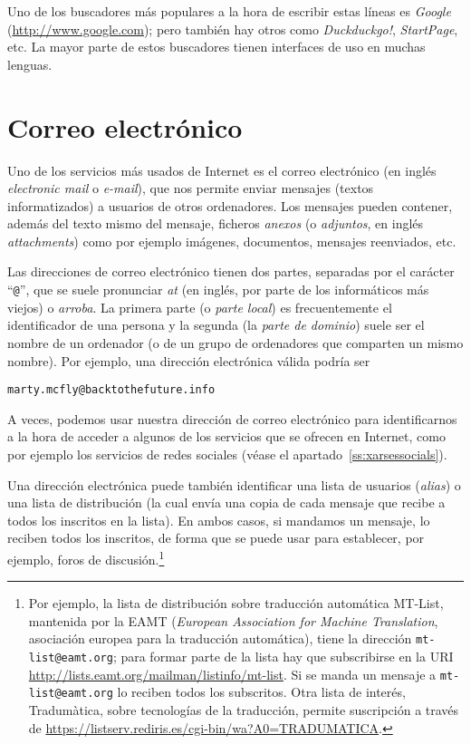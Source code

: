 Uno de los buscadores más populares a la hora de escribir estas líneas es \emph{Google} (\url{http://www.google.com}); pero también hay otros como \emph{Duckduckgo!}, \emph{StartPage}, etc. La mayor parte de estos buscadores tienen interfaces de uso en muchas lenguas. 

\section{Correo electrónico} \label{ss:correue} Uno de los servicios más usados de Internet es el correo electrónico (en inglés \emph{electronic mail} o \emph{e-mail}), que nos permite enviar mensajes (textos informatizados) a usuarios de otros ordenadores. Los mensajes pueden contener, además del texto mismo del mensaje, ficheros \emph{anexos} (o \emph{adjuntos}, en inglés \emph{attachments}) como por ejemplo imágenes, documentos, mensajes reenviados, etc. 

Las direcciones de correo electrónico tienen dos partes, separadas por el carácter ``\texttt{@}'', que se suele pronunciar \emph{at} (en inglés, por parte de los informáticos más viejos) o \emph{arroba}. La primera parte (o \emph{parte local}) es frecuentemente el identificador de una persona y la segunda (la \emph{parte de dominio}) suele ser el nombre de un ordenador (o de un grupo de ordenadores que comparten un mismo nombre). Por ejemplo, una dirección electrónica válida podría ser \begin{center} \texttt{marty.mcfly@backtothefuture.info} \end{center} A veces, podemos usar nuestra dirección de correo electrónico para identificarnos a la hora de acceder a algunos de los servicios que se ofrecen en Internet, como por ejemplo los servicios de redes sociales (véase el apartado~\ref{ss:xarsessocials}). 

Una dirección electrónica puede también identificar una lista de usuarios (\emph{alias}) o una lista de distribución (la cual envía una copia de cada mensaje que recibe a todos los inscritos en la lista). En ambos casos, si mandamos un mensaje, lo reciben todos los inscritos, de forma que se puede usar para establecer, por ejemplo, foros de discusión.\footnote{Por ejemplo, la lista de distribución sobre traducción automática MT-List, mantenida por la EAMT (\emph{European Association for Machine Translation}, asociación europea para la traducción automática), tiene la dirección \texttt{mt-list@eamt.org}; para formar parte de la lista hay que subscribirse en la URI \url{http://lists.eamt.org/mailman/listinfo/mt-list}. Si se manda un mensaje a \texttt{mt-list@eamt.org} lo reciben todos los subscritos. Otra lista de interés, Tradumàtica, sobre tecnologías de la traducción, permite suscripción a través de \url{https://listserv.rediris.es/cgi-bin/wa?A0=TRADUMATICA}.} 

